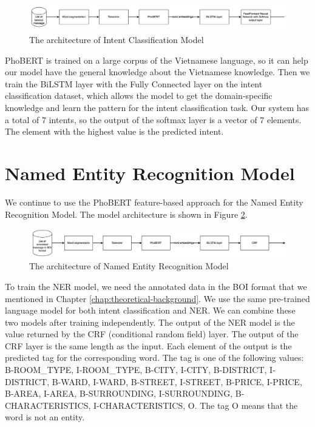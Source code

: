 \begin{figure}[ht]
    \centering
    \includegraphics[width=\textwidth]{../Images/7.System_Modeling/intent_classifier_architecture.png}
    \caption{The architecture of Intent Classification Model}
    \label{fig:intent-classification-model}
\end{figure}

PhoBERT is trained on a large corpus of the Vietnamese language, so it can help our model have the general knowledge about the Vietnamese knowledge. Then we train the BiLSTM layer with the Fully Connected layer on the intent classification dataset, which allows the model to get the domain-specific knowledge and learn the pattern for the intent classification task. Our system has a total of 7 intents, so the output of the softmax layer is a vector of 7 elements. The element with the highest value is the predicted intent. 

\section{Named Entity Recognition Model}
We continue to use the PhoBERT feature-based approach for the Named Entity Recognition Model. The model architecture is shown in Figure \ref{fig:ner-model}.

\begin{figure}[ht]
    \centering
    \includegraphics[width=\textwidth]{../Images/7.System_Modeling/ner_architecture.png}
    \caption{The architecture of Named Entity Recognition Model}
    \label{fig:ner-model}
\end{figure}

To train the NER model, we need the annotated data in the BOI format that we mentioned in Chapter \ref{chap:theoretical-background}. We use the same pre-trained language model for both intent classification and NER. We can combine these two models after training independently. The output of the NER model is the value returned by the CRF (conditional random field) layer. The output of the CRF layer is the same length as the input. Each element of the output is the predicted tag for the corresponding word. The tag is one of the following values: B-ROOM\_TYPE, I-ROOM\_TYPE, B-CITY, I-CITY, B-DISTRICT, I-DISTRICT, B-WARD, I-WARD, B-STREET, I-STREET, B-PRICE, I-PRICE, B-AREA, I-AREA, B-SURROUNDING, I-SURROUNDING, B-CHARACTERISTICS, I-CHARACTERISTICS, O. The tag O means that the word is not an entity. 

